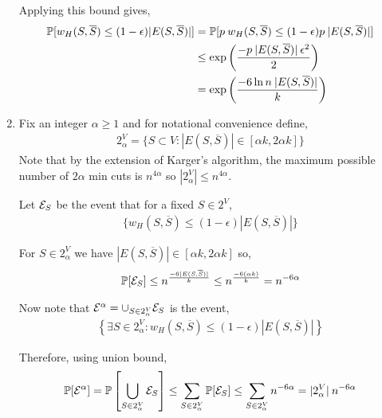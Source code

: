 \documentclass[10pt]{article}
\begin{document}
\begin{solution}[Solution]
\begin{enumerate}[label=(\alph*)]
    Applying this bound gives,
    \begin{align*}
        \mathbb{P}[ w_H(S,\overline{S}) \leq (1-\epsilon) |E(S,\overline{S})|]
        &= \mathbb{P}[ p \: w_H(S,\overline{S}) \leq (1-\epsilon) p\: |E(S,\overline{S})|]
        \\&\leq \exp \left( \frac{ -p\:|E(S,\overline{S})| \: \epsilon^2}{2}  \right)
        \\&= \exp \left( \frac{-6 \ln n \:|E(S,\overline{S})|}{k} \right)
    \end{align*}


    \item
        Fix an integer \( \alpha \geq 1 \) and for notational convenience define,
        \begin{align*}
            2^V_{\alpha} = \{ S \subset V : |E(S,\overline{S})| \in [\alpha k, 2 \alpha k] \} 
        \end{align*}     
        Note that by the extension of Karger's algorithm, the maximum possible number of \( 2 \alpha \) min cuts is \( n^{4 \alpha} \) so \( |2^V_{\alpha}| \leq n^{4 \alpha} \).
        
        Let \( \mathcal{E}_S \) be the event that for a fixed \( S \in 2^V \),
        \begin{align*}
            \{ w_H(S,\overline{S}) \leq (1-\epsilon) |E(S,\overline{S})| \}
        \end{align*}
        
        For \( S\in 2^V_{\alpha } \) we have \( |E(S,\overline{S})| \in [\alpha k, 2 \alpha k] \) so,
        \begin{align*}
            \mathbb{P}[\mathcal{E}_S] 
            \leq n^{\frac{-6 |E(S,\overline{S})|}{k}}
            \leq n^{\frac{-6 (\alpha k)}{k}}
            = n^{-6 \alpha }
        \end{align*}
       
        Now note that \( \mathcal{E}^{\alpha} = \cup_{S \in 2^V_{\alpha}} \mathcal{E}_S \) is the event,
        \begin{align*}
            \left\{ \exists S\in 2^V_{\alpha} : w_H(S,\overline{S}) \leq (1-\epsilon) |E(S,\overline{S})|  \right\}
        \end{align*}
        
        Therefore, using union bound, 
        \begin{align*}
            \mathbb{P}[\mathcal{E}^{\alpha}] 
            = \mathbb{P} \left[\bigcup_{S \in 2^V_{\alpha}} \mathcal{E}_S \right]
            \leq \sum_{S\in 2^V_{\alpha}} \mathbb{P}[\mathcal{E}_S]
            \leq \sum_{S\in 2^V_{\alpha}} n^{-6 \alpha} 
            =  |2^V_{\alpha}| \: n^{-6 \alpha}
        \end{align*}
        

\end{enumerate}
\end{solution}
\end{document}
